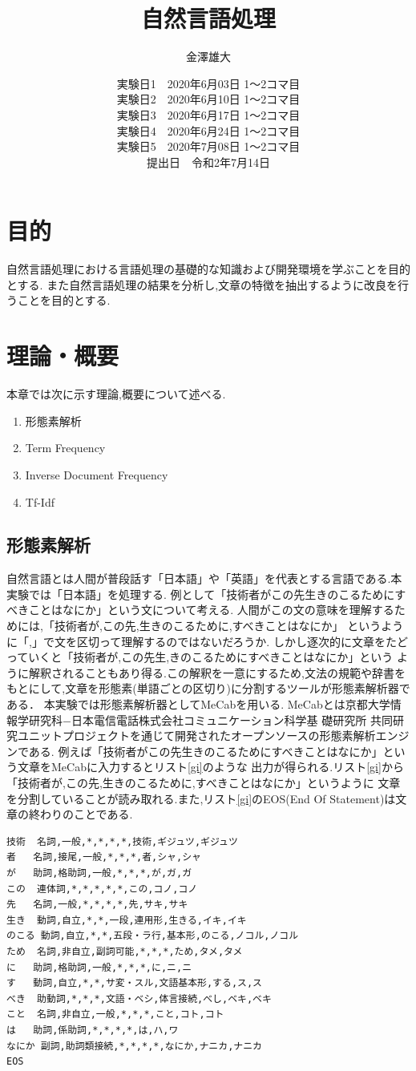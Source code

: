 \documentclass[a4j]{jarticle}
\title{自然言語処理}
\date{実験日1　2020年6月03日 1～2コマ目 \\ 実験日2　2020年6月10日 1～2コマ目 \\ 実験日3　2020年6月17日 1～2コマ目 \\ 実験日4　2020年6月24日 1～2コマ目 \\  実験日5　2020年7月08日 1～2コマ目 \\ 提出日　令和2年7月14日}
\author{金澤雄大}
\begin{document}
    \maketitle
    \thispagestyle{empty}
    \clearpage
    \addtocounter{page}{-1}

\section{目的}
自然言語処理における言語処理の基礎的な知識および開発環境を学ぶことを目的とする.
また自然言語処理の結果を分析し,文章の特徴を抽出するように改良を行うことを目的とする.
\section{理論・概要}
本章では次に示す理論,概要について述べる.
\begin{enumerate}
  \item 形態素解析
  \item Term Frequency
  \item Inverse Document Frequency
  \item Tf-Idf
\end{enumerate}
\subsection{形態素解析}
自然言語とは人間が普段話す「日本語」や「英語」を代表とする言語である.本実験では「日本語」を処理する.
例として「技術者がこの先生きのこるためにすべきことはなにか」という文について考える.
人間がこの文の意味を理解するためには,「技術者が,この先,生きのこるために,すべきことはなにか」
というように「,」で文を区切って理解するのではないだろうか.
しかし逐次的に文章をたどっていくと「技術者が,この先生,きのこるためにすべきことはなにか」という
ように解釈されることもあり得る.この解釈を一意にするため,文法の規範や辞書をもとにして,文章を形態素(単語ごとの区切り)に分割するツールが形態素解析器である．
本実験では形態素解析器としてMeCab\cite{mecab}を用いる. MeCabとは京都大学情報学研究科−日本電信電話株式会社コミュニケーション科学基
礎研究所 共同研究ユニットプロジェクトを通じて開発されたオープンソースの形態素解析エンジンである.
例えば「技術者がこの先生きのこるためにすべきことはなにか」という文章をMeCabに入力するとリスト\ref{gi}のような
出力が得られる.リスト\ref{gi}から「技術者が,この先,生きのこるために,すべきことはなにか」というように
文章を分割していることが読み取れる.また,リスト\ref{gi}のEOS(End Of Statement)は文章の終わりのことである.
\begin{lstlisting}[basicstyle=\ttfamily\footnotesize, frame=single,label=gi,caption=MeCabの出力の例]
技術	名詞,一般,*,*,*,*,技術,ギジュツ,ギジュツ
者	名詞,接尾,一般,*,*,*,者,シャ,シャ
が	助詞,格助詞,一般,*,*,*,が,ガ,ガ
この	連体詞,*,*,*,*,*,この,コノ,コノ
先	名詞,一般,*,*,*,*,先,サキ,サキ
生き	動詞,自立,*,*,一段,連用形,生きる,イキ,イキ
のこる	動詞,自立,*,*,五段・ラ行,基本形,のこる,ノコル,ノコル
ため	名詞,非自立,副詞可能,*,*,*,ため,タメ,タメ
に	助詞,格助詞,一般,*,*,*,に,ニ,ニ
す	動詞,自立,*,*,サ変・スル,文語基本形,する,ス,ス
べき	助動詞,*,*,*,文語・ベシ,体言接続,べし,ベキ,ベキ
こと	名詞,非自立,一般,*,*,*,こと,コト,コト
は	助詞,係助詞,*,*,*,*,は,ハ,ワ
なにか	副詞,助詞類接続,*,*,*,*,なにか,ナニカ,ナニカ
EOS
    \end{lstlisting}
\end{document}
